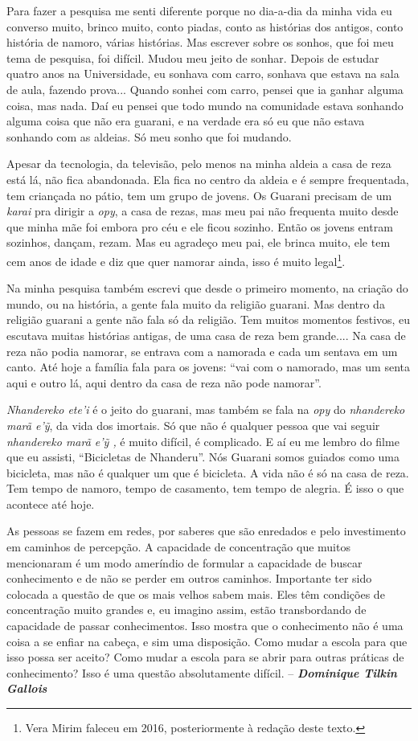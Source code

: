 Para fazer a pesquisa me senti diferente porque no dia-a-dia da minha
vida eu converso muito, brinco muito, conto piadas, conto as histórias
dos antigos, conto história de namoro, várias histórias. Mas escrever
sobre os sonhos, que foi meu tema de pesquisa, foi difícil. Mudou meu
jeito de sonhar. Depois de estudar quatro anos na Universidade, eu
sonhava com carro, sonhava que estava na sala de aula, fazendo prova...
Quando sonhei com carro, pensei que ia ganhar alguma coisa, mas nada.
Daí eu pensei que todo mundo na comunidade estava sonhando alguma coisa
que não era guarani, e na verdade era só eu que não estava sonhando com
as aldeias. Só meu sonho que foi mudando.

Apesar da tecnologia, da televisão, pelo menos na minha aldeia a casa de
reza está lá, não fica abandonada. Ela fica no centro da aldeia e é
sempre frequentada, tem criançada no pátio, tem um grupo de jovens. Os
Guarani precisam de um \emph{karai} pra dirigir a \emph{opy}, a casa de
rezas, mas meu pai não frequenta muito desde que minha mãe foi embora
pro céu e ele ficou sozinho\emph{.} Então os jovens entram sozinhos,
dançam, rezam. Mas eu agradeço meu pai, ele brinca muito, ele tem cem
anos de idade e diz que quer namorar ainda, isso é muito legal\footnote{Vera
  Mirim faleceu em 2016, posteriormente à redação deste texto.}.

Na minha pesquisa também escrevi que desde o primeiro momento, na
criação do mundo, ou na história, a gente fala muito da religião
guarani. Mas dentro da religião guarani a gente não fala só da religião.
Tem muitos momentos festivos, eu escutava muitas histórias antigas, de
uma casa de reza bem grande.... Na casa de reza não podia namorar, se
entrava com a namorada e cada um sentava em um canto. Até hoje a família
fala para os jovens: ``vai com o namorado, mas um senta aqui e outro lá,
aqui dentro da casa de reza não pode namorar''.

\emph{Nhandereko ete'i} é o jeito do guarani, mas também se fala na
\emph{opy} do \emph{nhandereko marã e'ỹ}, da vida dos imortais. Só que
não é qualquer pessoa que vai seguir \emph{nhandereko marã e'ỹ ,} é
muito difícil, é complicado. E aí eu me lembro do filme que eu assisti,
``Bicicletas de Nhanderu''. Nós Guarani somos guiados como uma
bicicleta, mas não é qualquer um que é bicicleta. A vida não é só na
casa de reza. Tem tempo de namoro, tempo de casamento, tem tempo de
alegria. É isso o que acontece até hoje.

As pessoas se fazem em redes, por saberes que são enredados e pelo
investimento em caminhos de percepção. A capacidade de concentração que
muitos mencionaram é um modo ameríndio de formular a capacidade de
buscar conhecimento e de não se perder em outros caminhos. Importante
ter sido colocada a questão de que os mais velhos sabem mais. Eles têm
condições de concentração muito grandes e, eu imagino assim, estão
transbordando de capacidade de passar conhecimentos. Isso mostra que o
conhecimento não é uma coisa a se enfiar na cabeça, e sim uma
disposição. Como mudar a escola para que isso possa ser aceito? Como
mudar a escola para se abrir para outras práticas de conhecimento? Isso
é uma questão absolutamente difícil. -- \emph{\textbf{Dominique Tilkin
Gallois}}

